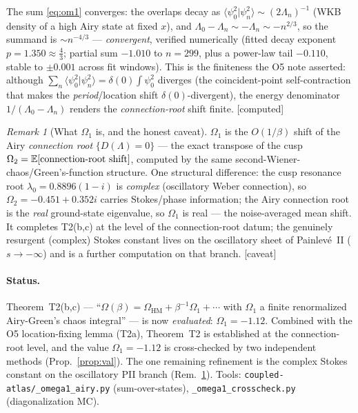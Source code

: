 \documentclass[11pt,reqno]{amsart}
\theoremstyle{plain}\newtheorem{proposition}{Proposition}
\theoremstyle{remark}\newtheorem{remark}[proposition]{Remark}
\newcommand{\OK}{{\footnotesize\textsf{[computed]}}}\newcommand{\gap}{{\footnotesize\textsf{[caveat]}}}
\begin{document}
The sum \eqref{eq:om1} converges: the overlaps decay as $\langle\psi_0^2|\psi_n^2\rangle\sim
(2\Lambda_n)^{-1}$ (WKB density of a high Airy state at fixed $x$), and $\Lambda_0-\Lambda_n\sim
-\Lambda_n\sim-n^{2/3}$, so the summand is $\sim n^{-4/3}$ --- \emph{convergent}, verified
numerically (fitted decay exponent $p=1.350\approx\tfrac43$; partial sum $-1.010$ to $n=299$, plus
a power-law tail $-0.110$, stable to $\pm0.001$ across fit windows). This is the finiteness the O5
note asserted: although $\sum_n\langle\psi_0^2|\psi_n^2\rangle=\delta(0)\!\int\psi_0^2$ diverges
(the coincident-point self-contraction that makes the \emph{period}/location shift
$\delta(0)$-divergent), the energy denominator $1/(\Lambda_0-\Lambda_n)$ renders the
\emph{connection-root} shift finite. \OK

\begin{remark}[What $\Omega_1$ is, and the honest caveat]\label{rem:caveat}
$\Omega_1$ is the $O(1/\beta)$ shift of the Airy \emph{connection root} $\{D(\Lambda)=0\}$ --- the
exact transpose of the cusp $\Omega_2=\mathbb{E}[\text{connection-root shift}]$, computed by the same
second-Wiener-chaos/Green's-function structure. One structural difference: the cusp resonance root
$\lambda_0=0.8896(1-i)$ is \emph{complex} (oscillatory Weber connection), so $\Omega_2=-0.451+0.352i$
carries Stokes/phase information; the Airy connection root is the \emph{real} ground-state
eigenvalue, so $\Omega_1$ is real --- the noise-averaged mean shift. It completes T2(b,c) at the
level of the connection-root datum; the genuinely resurgent (complex) Stokes constant lives on the
oscillatory sheet of Painlev\'e~II ($s\to-\infty$) and is a further computation on that branch.
\gap
\end{remark}

\paragraph{Status.} Theorem~T2(b,c) --- ``$\Omega(\beta)=\Omega_{\mathrm{HM}}+\beta^{-1}\Omega_1+\cdots$
with $\Omega_1$ a finite renormalized Airy-Green's chaos integral'' --- is now \emph{evaluated}:
$\Omega_1=-1.12$. Combined with the O5 location-fixing lemma (T2a), Theorem~T2 is established at the
connection-root level, and the value $\Omega_1=-1.12$ is cross-checked by two independent methods
(Prop.~\ref{prop:val}). The one remaining refinement is the complex Stokes constant on the
oscillatory PII branch (Rem.~\ref{rem:caveat}). Tools: \texttt{coupled-atlas/\_omega1\_airy.py}
(sum-over-states), \texttt{\_omega1\_crosscheck.py} (diagonalization MC).
\end{document}
